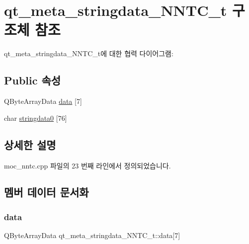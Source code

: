\hypertarget{structqt__meta__stringdata___n_n_t_c__t}{}\section{qt\+\_\+meta\+\_\+stringdata\+\_\+\+N\+N\+T\+C\+\_\+t 구조체 참조}
\label{structqt__meta__stringdata___n_n_t_c__t}


qt\+\_\+meta\+\_\+stringdata\+\_\+\+N\+N\+T\+C\+\_\+t에 대한 협력 다이어그램\+:
\subsection*{Public 속성}
\begin{DoxyCompactItemize}
\item 
Q\+Byte\+Array\+Data \mbox{\hyperlink{structqt__meta__stringdata___n_n_t_c__t_a1988b1cb4f257cb777beff4dbb53aab3}{data}} \mbox{[}7\mbox{]}
\item 
char \mbox{\hyperlink{structqt__meta__stringdata___n_n_t_c__t_a548db5e4d601c75e146dbff640fcdbd8}{stringdata0}} \mbox{[}76\mbox{]}
\end{DoxyCompactItemize}


\subsection{상세한 설명}


moc\+\_\+nntc.\+cpp 파일의 23 번째 라인에서 정의되었습니다.



\subsection{멤버 데이터 문서화}
\mbox{\label{structqt__meta__stringdata___n_n_t_c__t_a1988b1cb4f257cb777beff4dbb53aab3}} 
\subsubsection{\texorpdfstring{data}{data}}
{\footnotesize\ttfamily Q\+Byte\+Array\+Data qt\+\_\+meta\+\_\+stringdata\+\_\+\+N\+N\+T\+C\+\_\+t\+::data\mbox{[}7\mbox{]}}



